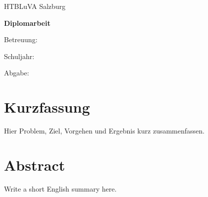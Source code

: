 \documentclass[12pt,a4paper,oneside]{scrreprt}
\begin{document}
\begin{titlepage}
\centering
{\Large HTBLuVA Salzburg\par}
\vspace{2cm}
{\huge\bfseries Diplomarbeit\par}
\vspace{1cm}
{\LARGE \Arbeitstitel\par}
\vspace{2cm}
{\large \Team\par}
\vfill
Betreuung: \Betreuung\par
Schuljahr: \Schuljahr\par
Abgabe: \Abgabedatum
\end{titlepage}
\chapter*{Kurzfassung}
Hier Problem, Ziel, Vorgehen und Ergebnis kurz zusammenfassen.
\chapter*{Abstract}
Write a short English summary here.
\tableofcontents
\clearpage
{}








\printbibliography[heading=bibintoc,title={Literaturverzeichnis}]
\appendix

\end{document}
